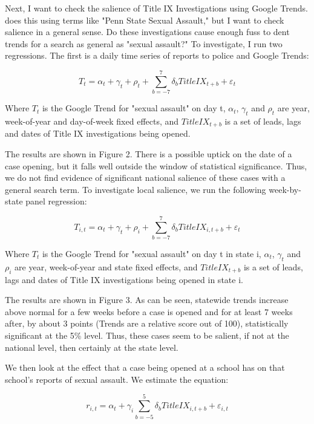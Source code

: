 \documentclass[AER]{AEA}
\begin{document}
Next, I want to check the salience of Title IX Investigations using Google Trends.  does this using terms like "Penn State Sexual Assault," but I want to check salience in a general sense. Do these investigations cause enough fuss to dent trends for a search as general as "sexual assault?" To investigate, I run two regressions. The first is a daily time series of reports to police and Google Trends:

$$
T_{t} = \alpha_{t} + \gamma_{t} + \rho_{t} + \sum_{b=-7}^{7} \delta_{b} TitleIX_{t+b} + \varepsilon_{t}
$$

Where $T_{t}$ is the Google Trend for "sexual assault" on day t, $\alpha_{t}$, $\gamma_{t}$ and $\rho_{t}$ are year, week-of-year and day-of-week fixed effects, and $TitleIX_{t+b}$ is a set of leads, lags and dates of Title IX investigations being opened. 

The results are shown in Figure 2. There is a possible uptick on the date of a case opening, but it falls well outside the window of statistical significance. Thus, we do not find evidence of significant national salience of these cases with a general search term. To investigate local salience, we run the following week-by-state panel regression: 

$$
T_{i,t} = \alpha_{t} + \gamma_{t} + \rho_{i} + \sum_{b=-7}^{7} \delta_{b} TitleIX_{i,t+b} + \varepsilon_{t}
$$

Where $T_{t}$ is the Google Trend for "sexual assault" on day t in state i, $\alpha_{t}$, $\gamma_{t}$ and $\rho_{i}$ are year, week-of-year and state fixed effects, and $TitleIX_{t+b}$ is a set of leads, lags and dates of Title IX investigations being opened in state i. 

The results are shown in Figure 3. As can be seen, statewide trends increase above normal for a few weeks before a case is opened and for at least 7 weeks after, by about 3 points (Trends are a relative score out of 100), statistically significant at the 5\% level. Thus, these cases seem to be salient, if not at the national level, then certainly at the state level.

We then look at the effect that a case being opened at a school has on that school's reports of sexual assault. We estimate the equation:

$$
r_{i,t} = \alpha_{t} + \gamma_{i} \sum_{b=-5}^{5} \delta_{b} TitleIX_{i,t+b} + \varepsilon_{i,t}
$$
\end{document}
